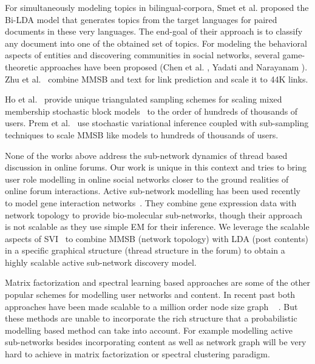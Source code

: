 \documentclass{sig-alternate}
\begin{document}
For simultaneously modeling topics in bilingual-corpora, Smet et al.
\cite{Smet:2011:KTA:2017863.2017915} proposed the Bi-LDA model that generates
topics from the target languages for paired documents in these very languages.
The end-goal of their approach is to classify any document into one of the
obtained set of topics. For modeling the behavioral aspects of entities and
discovering communities in social networks, several game-theoretic approaches
have been proposed (Chen et al. \cite{Chen:2010:GFI:1842547.1842566}, Yadati and
Narayanam \cite{Yadati:2011:GTM:1963192.1963316}). Zhu et
al.~\cite{Zhu:getoor:MMSB-text} combine MMSB and text for link prediction and
scale it to 44K links.

Ho et al.~\cite{HoYX12} provide  unique triangulated sampling schemes for scaling
mixed membership stochastic block models~\cite{Airoldi:2008:MMS:1390681.1442798} to
the order of hundreds of thousands of users. Prem et
al.~\cite{conf/nips/GopalanMGFB12} use stochastic variational inference 
coupled with sub-sampling techniques to
scale MMSB like models to hundreds of thousands of users.


None of the works above address the sub-network dynamics of thread based
discussion in online forums. Our work is unique in this context and tries to
bring user role modelling in online social networks closer to the
ground realities of online forum interactions.
Active sub-network modelling has been used recently to model gene interaction 
networks~\cite{Lichtenstein:Charleston}. They
combine gene expression data with network topology to provide bio-molecular 
sub-networks, though their approach is not scalable as they use simple EM for
their inference. We leverage the scalable aspects of
SVI~\cite{Hoffman:2013:SVI} to combine MMSB (network topology) with LDA (post
contents) in a specific graphical structure (thread structure in the forum) to
obtain a highly scalable active sub-network discovery model.

Matrix factorization and spectral learning based approaches are some of the
other popular schemes for modelling user networks and content. In recent
past both approaches have been made scalable to a million order node size graph
~ \cite{Gemulla:2011:LMF,Dhillon:2005:FKM}. But these methods are unable to incorporate 
the rich structure that a probabilistic modelling based method can take into account.
For example modelling active sub-networks besides incorporating content as well
as network graph will be very hard to achieve in matrix factorization or 
spectral clustering paradigm.
\end{document}
